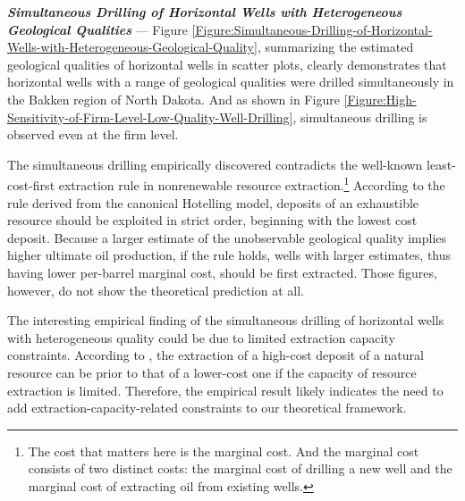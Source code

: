 \par
\vspace{0.3cm}
\noindent
\textit{\textbf{Simultaneous Drilling of Horizontal Wells with Heterogeneous Geological Qualities}} ---
Figure \ref{Figure:Simultaneous-Drilling-of-Horizontal-Wells-with-Heterogeneous-Geological-Quality}, summarizing the estimated geological qualities of horizontal wells in scatter plots, clearly demonstrates that horizontal wells with a range of geological qualities were drilled simultaneously in the Bakken region of North Dakota. And as shown in Figure \ref{Figure:High-Sensitivity-of-Firm-Level-Low-Quality-Well-Drilling}, simultaneous drilling is observed even at the firm level. 

The simultaneous drilling empirically discovered contradicts the well-known least-cost-first extraction rule in nonrenewable resource extraction.\footnote{The cost that matters here is the marginal cost. And the marginal cost consists of two distinct costs: the marginal cost of drilling a new well and the marginal cost of extracting oil from existing wells.} According to the rule derived from the canonical Hotelling model, deposits of an exhaustible resource should be exploited in strict order, beginning with the lowest cost deposit. Because a larger estimate of the unobservable geological quality implies higher ultimate oil production, if the rule holds, wells with larger estimates, thus having lower per-barrel marginal cost, should be first extracted. Those figures, however, do not show the theoretical prediction at all. 

The interesting empirical finding of the simultaneous drilling of horizontal wells with heterogeneous quality could be due to limited extraction capacity constraints. According to \cite{Extraction-Capacity-and-the-Optimal-Order-of-Extraction_Holland_2003}, the extraction of a high-cost deposit of a natural resource can be prior to that of a lower-cost one if the capacity of resource extraction is limited. Therefore, the empirical result likely indicates the need to add extraction-capacity-related constraints to our theoretical framework. 
